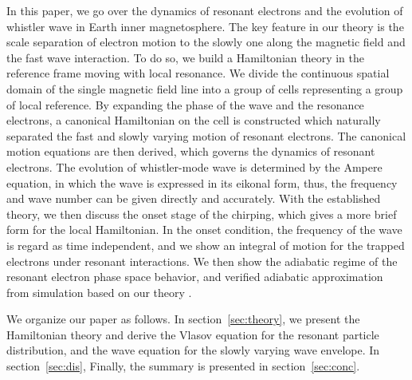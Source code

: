 In this paper, we go over the dynamics of resonant electrons and the evolution of whistler wave in Earth inner magnetosphere.
The key feature in our theory is the scale separation of electron motion to the slowly one along the magnetic field and the fast wave interaction. 
To do so, we build a Hamiltonian theory in the reference frame moving with local resonance.
We divide the continuous spatial domain of the single magnetic field line into a group of cells representing a group of local reference.
By expanding the phase of the wave and the resonance electrons, a canonical Hamiltonian on the cell is constructed which naturally separated the fast and slowly varying motion of resonant electrons.
The canonical motion equations are then derived, which governs the dynamics of resonant electrons. 
The evolution of whistler-mode wave is determined by the Ampere equation, in which the wave is expressed in its eikonal form, thus, the frequency and wave number can be given directly and accurately.
With the established theory, we then discuss the onset stage of the chirping, which gives a more brief form for the local Hamiltonian. 
In the onset condition, the frequency of the wave is regard as time independent, and we show an integral of motion for the trapped electrons under resonant interactions.
We then show the adiabatic regime of the resonant electron phase space behavior, and verified adiabatic approximation from simulation based on our theory \cite{zheng2023b}.


We organize our paper as follows. In section~\ref{sec:theory}, we present the Hamiltonian theory and derive the Vlasov equation for the resonant particle distribution, and the wave equation for the slowly varying wave envelope.
In section~\ref{sec:dis}, 
Finally, the summary is presented in section~\ref{sec:conc}.
